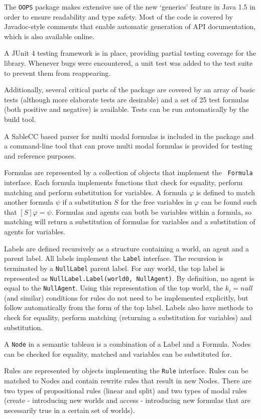 The {\tt OOPS} package makes extensive use of the new `generics' feature in Java 1.5 in
order to ensure readability and type safety. Most of the code is covered by
Javadoc-style comments that enable automatic generation of API documentation,
which is also available online.

A JUnit 4 testing framework is in place, providing partial testing coverage
for the library. Whenever bugs were encountered, a unit test was added to the
test suite to prevent them from reappearing.

Additionally, several critical parts of the package are covered by an array of
basic tests (although more elaborate tests are desirable) and a set of 25
test formulas (both positive and negative) is available. Tests can be run
automatically by the build tool.

A SableCC based parser for multi modal formulas is included in the package and
a command-line tool that can prove multi modal formulas is provided for
testing and reference purposes. 

Formulas are represented by a collection of objects that implement the {\tt
Formula} interface. Each formula implements functions that check for equality,
perform matching and perform substitution for variables. A formula $\varphi$
is defined to match another formula $\psi$ if a substitution $S$ for the free
variables in $\varphi$ can be found such that $\left[ S \right] \varphi =
\psi$. Formulas and agents can both be variables within a formula, so matching
will return a substitution of formulas for variables and a substitution of
agents for variables.

Labels are defined recursively as a structure containing a world, an agent and
a parent label. All labels implement the {\tt Label} interface. The recursion
is terminated by a {\tt NullLabel} parent label. For any world, the top label
is represented as {\tt NullLabel.Label(world0, NullAgent)}. By definition, no
agent is equal to the {\tt NullAgent}. Using this representation of the top
world, the $k_i = null$ (and similar) conditions for rules do not need to be
implemented explicitly, but follow automatically from the form of the top
label. Labels also have methods to check for equality, perform matching
(returning a substitution for variables) and substitution.

A {\tt Node} in a semantic tableau is a combination of a Label and a Formula.
Nodes can be checked for equality, matched and variables can be substituted
for.

Rules are represented by objects implementing the {\tt Rule} interface. Rules
can be matched to Nodes and contain rewrite rules that result in new Nodes.
There are two types of propositional rules (linear and split) and two types of
modal rules (create - introducing new worlds and access - introducing new
formulas that are necessarily true in a certain set of worlds).

